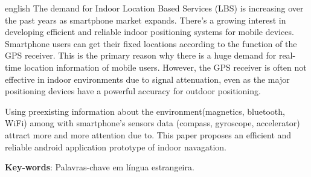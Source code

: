 \begin{resumo}[Abstract]			%
\begin{otherlanguage*}{english}		%
The demand for Indoor Location Based Services
(LBS) is increasing over the past years as
smartphone market expands. There's a growing
interest in developing efficient and reliable
indoor positioning systems for mobile devices.
Smartphone users can get their fixed locations
according to the function of the GPS receiver.
This is the primary reason why there is a huge
demand for real-time location information of
mobile users. However, the GPS receiver is
often not effective in indoor environments due
to signal attenuation, even as the major
positioning devices have a powerful accuracy
for outdoor positioning.

Using preexisting information about the environment(magnetics, bluetooth, WiFi) among with smartphone's sensors data (compass, gyroscope, accelerator) attract more and more attention due to. This paper proposes an efficient and reliable android application prototype of indoor navagation.

\vspace{\onelineskip}
\noindent
\textbf{Key-words}: Palavras-chave em língua estrangeira.
\end{otherlanguage*}
\end{resumo}

% 

%  
